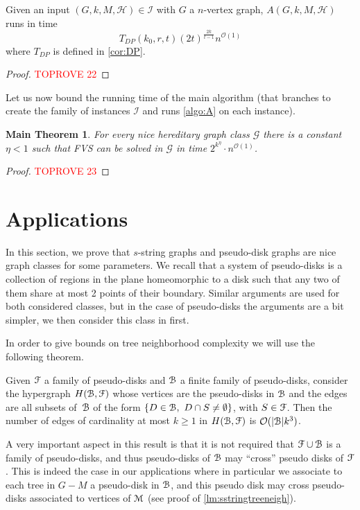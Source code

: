 \documentclass{amsart}
\newtheorem*{main-thm}{Main Theorem}
\newcommand{\I}{\mathcal{I}}
\newcommand{\mH}{\mathcal{H}}
\newcommand{\tdp}{T_{DP}}
\renewcommand{\O}{\mathcal{O}}
\begin{document}
\begin{lemma}\label{lm:complexityA}
Given an input $(G,k,M,\mH)\in \I$ with $G$ a $n$-vertex graph, $A(G,k,M,\mH)$ runs in time
$$\tdp\left(k_0,r,t\right)(2t)^{\frac{2k}{t-1}}n^{\O(1)}$$ where $\tdp$ is defined in \autoref{cor:DP}.
\end{lemma}
\begin{proof}\textcolor{red}{TOPROVE 22}\end{proof}

Let us now bound the running time of the main algorithm (that branches to create the family of instances $\I$ and runs \autoref{algo:A} on each instance).
\begin{main-thm}
For every nice hereditary graph class $\mathcal{G}$ there is a constant $\eta<1$ such that FVS can be solved in $\mathcal{G}$ in time $2^{k^\eta}\cdot  n^{\O(1)}$.

\end{main-thm}
\begin{proof}\textcolor{red}{TOPROVE 23}\end{proof}



\section{Applications}\label{sec:applications}
In this section, we prove that $s$-string graphs and pseudo-disk graphs are nice graph classes for some parameters. We recall that a system of pseudo-disks is a collection of regions in the plane homeomorphic to a disk such that any two of them share at most 2 points of their boundary.
Similar arguments are used for both considered classes, but in the case of pseudo-disks the arguments are a bit simpler, we then consider this class in first.

 In order to give bounds on tree neighborhood complexity we will use the following theorem.
 
 \begin{theorem}\label{hyperpseudo}
    Given $\EuScript{F}$ a family of pseudo-disks and $\EuScript B$ a finite family of pseudo-disks, consider the hypergraph $H(\EuScript B,\EuScript F)$ whose vertices are the pseudo-disks in $\EuScript B$ and the edges are all subsets of~$\EuScript B$ of the form $\{D \in \EuScript B,~D \cap S \neq \emptyset\}$, with $S\in \EuScript F$.
  Then the number of edges of cardinality at most $k\geq 1$ in $H(\EuScript B,\EuScript F)$ is $\O(|\EuScript B|k^3)$.
\end{theorem}
A very important aspect in this result is that it is not required that $\EuScript{F} \cup \EuScript{B}$ is a family of pseudo-disks, and thus pseudo-disks of $\EuScript B$ may ``cross'' pseudo disks of $\EuScript F$.
This is indeed the case in our applications where in particular we associate to each tree in $G-M$ a pseudo-disk in $\EuScript{B}$, and this pseudo disk may cross pseudo-disks associated to vertices of  $\EuScript{M}$ (see proof of \autoref{lm:sstringtreeneigh}).
\end{document}
